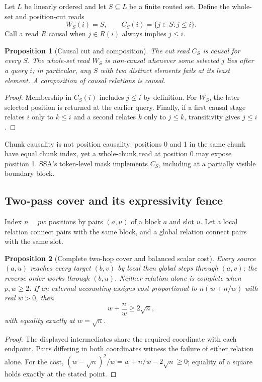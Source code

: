\documentclass[11pt]{article}
\numberwithin{equation}{section}
\newtheorem{proposition}{Proposition}
\begin{document}
Let $L$ be linearly ordered and let $S\subseteq L$ be a finite routed set. Define the whole-set and
position-cut reads
\begin{equation}\label{eq:app-causal-cut}
W_S(i)=S,
\qquad C_S(i)=\{j\in S:j\le i\}.
\end{equation}
Call a read $R$ causal when $j\in R(i)$ always implies $j\le i$.

\begin{proposition}[Causal cut and composition]\label{prop:app-causal-cut}
The cut read $C_S$ is causal for every $S$. The whole-set read $W_S$ is non-causal whenever some selected
$j$ lies after a query $i$; in particular, any $S$ with two distinct elements fails at its least element. A
composition of causal relations is causal.
\end{proposition}
\begin{proof}
Membership in $C_S(i)$ includes $j\le i$ by definition. For $W_S$, the later selected position is returned at
the earlier query. Finally, if a first causal stage relates $i$ only to $k\le i$ and a second relates $k$ only
to $j\le k$, transitivity gives $j\le i$.
\end{proof}

Chunk causality is not position causality: positions 0 and 1 in the same chunk have equal chunk index, yet a
whole-chunk read at position 0 may expose position 1. SSA's token-level mask implements $C_S$, including at a
partially visible boundary block.

\subsection{Two-pass cover and its expressivity fence}

Index $n=pw$ positions by pairs $(a,u)$ of a block $a$ and slot $u$. Let a local relation connect pairs with
the same block, and a global relation connect pairs with the same slot.

\begin{proposition}[Complete two-hop cover and balanced scalar cost]\label{prop:app-two-hop}
Every source $(a,u)$ reaches every target $(b,v)$ by local then global steps through $(a,v)$; the reverse order
works through $(b,u)$. Neither relation alone is complete when $p,w\ge2$. If an external accounting assigns
cost proportional to $n(w+n/w)$ with real $w>0$, then
\begin{equation}\label{eq:app-balanced}
w+\frac nw\ge2\sqrt n,
\end{equation}
with equality exactly at $w=\sqrt n$.
\end{proposition}
\begin{proof}
The displayed intermediates share the required coordinate with each endpoint. Pairs differing in both
coordinates witness the failure of either relation alone. For the cost,
$(w-\sqrt n)^2/w=w+n/w-2\sqrt n\ge0$; equality of a square holds exactly at the stated point.
\end{proof}
\end{document}
